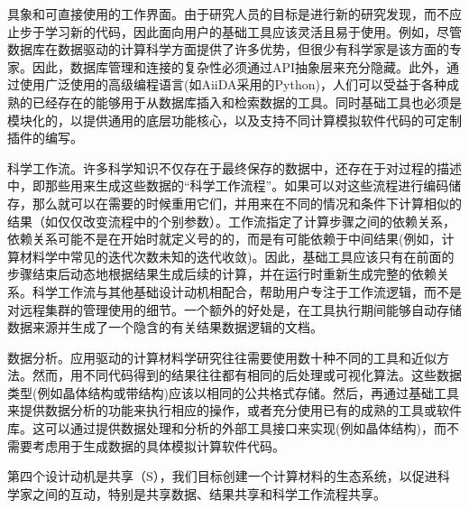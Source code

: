 \begin{alphaenum}
    \item 具象和可直接使用的工作界面。由于研究人员的目标是进行新的研究发现，而不应止步于学习新的代码，因此面向用户的基础工具应该灵活且易于使用。例如，尽管数据库在数据驱动的计算科学方面提供了许多优势，但很少有科学家是该方面的专家。因此，数据库管理和连接的复杂性必须通过API抽象层来充分隐藏。此外，通过使用广泛使用的高级编程语言(如AiiDA采用的Python)，人们可以受益于各种成熟的已经存在的能够用于从数据库插入和检索数据的工具。同时基础工具也必须是模块化的，以提供通用的底层功能核心，以及支持不同计算模拟软件代码的可定制插件的编写。
    \item 科学工作流。许多科学知识不仅存在于最终保存的数据中，还存在于对过程的描述中，即那些用来生成这些数据的“科学工作流程”。如果可以对这些流程进行编码储存，那么就可以在需要的时候重用它们，并用来在不同的情况和条件下计算相似的结果（如仅仅改变流程中的个别参数）。工作流指定了计算步骤之间的依赖关系，依赖关系可能不是在开始时就定义号的的，而是有可能依赖于中间结果(例如，计算材料学中常见的迭代次数未知的迭代收敛)。因此，基础工具应该只有在前面的步骤结束后动态地根据结果生成后续的计算，并在运行时重新生成完整的依赖关系。科学工作流与其他基础设计动机相配合，帮助用户专注于工作流逻辑，而不是对远程集群的管理使用的细节。一个额外的好处是，在工具执行期间能够自动存储数据来源并生成了一个隐含的有关结果数据逻辑的文档。
    \item 数据分析。应用驱动的计算材料学研究往往需要使用数十种不同的工具和近似方法。然而，用不同代码得到的结果往往都有相同的后处理或可视化算法。这些数据类型(例如晶体结构或带结构)应该以相同的公共格式存储。然后，再通过基础工具来提供数据分析的功能来执行相应的操作，或者充分使用已有的成熟的工具或软件库。这可以通过提供数据处理和分析的外部工具接口来实现(例如晶体结构\cite{ong2013python})，而不需要考虑用于生成数据的具体模拟计算软件代码。
\end{alphaenum}

第四个设计动机是共享（S），我们目标创建一个计算材料的生态系统，以促进科学家之间的互动，特别是共享数据、结果共享和科学工作流程共享。

